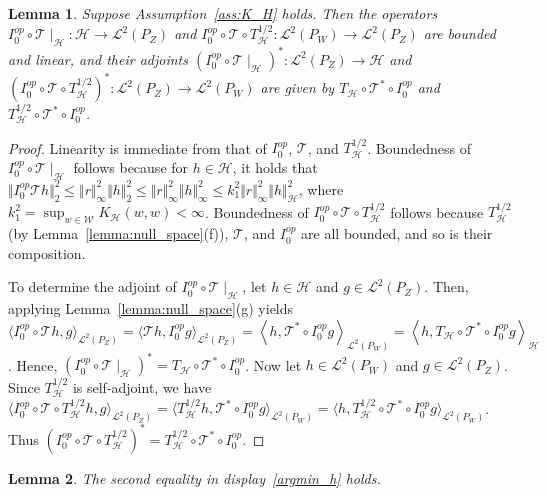 \documentclass[twoside,11pt]{article}
\newtheorem{lemma}{Lemma}
\newcommand{\mc}{\mathcal}
\begin{document}
\begin{lemma}
    Suppose Assumption~\ref{ass:K_H} holds. Then the operators $I_0^{op}\circ\mc{T}\mid_\mc{H}:\mc{H} \rightarrow \mc{L}^2(P_{Z})$ and $I_0^{op}\circ\mc{T}\circ T_\mc{H}^{1/2}:\mc{L}^2(P_{W})\rightarrow\mc{L}^2(P_{Z})$ are bounded and linear, and their adjoints $(I_0^{op}\circ\mc{T}\mid_\mc{H})^*:\mc{L}^2(P_Z)\rightarrow\mc{H}$ and $(I_0^{op}\circ\mc{T}\circ T_\mc{H}^{1/2})^*:\mc{L}^2(P_Z)\rightarrow\mc{L}^2(P_W)$ are given by $T_\mc{H}\circ\mc{T}^*\circ I_0^{op}$ and $T_\mc{H}^{1/2}\circ\mc{T}^*\circ I_0^{op}$. \label{lemma:i0t_bounded}
\end{lemma}

\begin{proof}
    Linearity is immediate from that of $I_0^{op}$, $\mc{T}$, and $T_\mc{H}^{1/2}$. Boundedness of $I_0^{op}\circ\mc{T}\mid_\mc{H}$ follows because for $h \in \mc{H}$, it holds that $\Vert I_0^{op}\mc{T}h\Vert_2^2\le\Vert r\Vert_\infty^2\Vert h\Vert_2^2\le\Vert r\Vert_\infty^2\Vert h\Vert_\infty^2\le k_1^2\Vert r\Vert_\infty^2\Vert h\Vert_\mc{H}^2$,
   where $k_1^2=\sup_{w\in\mc{W}}K_\mc{H}(w,w)<\infty$. Boundedness of $I_0^{op}\circ\mc{T}\circ T_\mc{H}^{1/2}$ follows because $T_\mc H^{1/2}$(by Lemma~\ref{lemma:null_space}(f)), $\mc T$, and $I_0^{op}$ are all bounded, and so is their composition.

   To determine the adjoint of $I_0^{op}\circ\mc{T}\mid_\mc{H}$, let $h\in\mc{H}$ and $g\in\mc{L}^2(P_Z)$. Then, applying Lemma~\ref{lemma:null_space}(g) yields $\langle I_0^{op}\circ\mc{T}h,g\rangle_{\mc{L}^2(P_Z)}=\langle \mc{T}h,I_0^{op}g\rangle_{\mc{L}^2(P_Z)}=\left\langle h,\mc{T}^*\circ I_0^{op}g\right\rangle_{\mc{L}^2(P_W)}=\left\langle h,T_\mc{H}\circ\mc{T}^*\circ I_0^{op}g\right\rangle_\mc{H}$. Hence, $(I_0^{op}\circ\mc{T}\mid_\mc{H})^*=T_\mc{H}\circ\mc{T}^*\circ I_0^{op}$. Now let $h\in\mc{L}^2(P_W)$ and $g\in\mc{L}^2(P_Z)$. Since $T_\mc{H}^{1/2}$ is self-adjoint, we have $ \langle I_0^{op}\circ\mc{T}\circ T_\mc{H}^{1/2}h,g\rangle_{\mc{L}^2(P_Z)}=\langle T_\mc{H}^{1/2}h,\mc{T}^*\circ I_0^{op}g\rangle_{\mc{L}^2(P_W)}=\langle h,T_\mc{H}^{1/2}\circ\mc{T}^*\circ I_0^{op}g\rangle_{\mc{L}^2(P_W)}$. Thus $(I_0^{op}\circ\mc{T}\circ T_\mc{H}^{1/2})^*=T_\mc{H}^{1/2}\circ\mc{T}^*\circ I_0^{op}$.
\end{proof}

\begin{lemma}
The second equality in display~\eqref{argmin_h} holds.
    \label{lemma:h_lambda}
\end{lemma}
\end{document}
